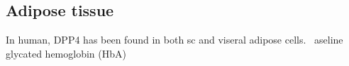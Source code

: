 \subsection{Adipose tissue}
In human, DPP4 has been found in both sc and viseral adipose cells.~\cite{Lamers2011} aseline glycated hemoglobin (HbA) 